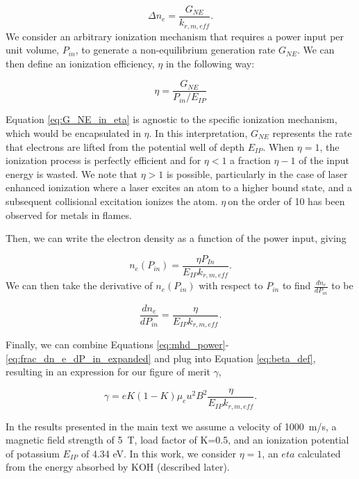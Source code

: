 \begin{equation}
\Delta n_{e} = \frac{G_{NE}}{k_{r, m, eff}}.
\end{equation}
We consider an arbitrary ionization mechanism that requires a power input per unit volume, \(P_{in}\), to generate a non-equilibrium generation rate \(G_{NE}\). We can then define an ionization efficiency, \(\eta\) in the following way: 

\begin{equation}
\eta = \frac{G_{NE}}{P_{in}/E_{IP}}
\label{eq:G_NE_in_eta}
\end{equation}

Equation \ref{eq:G_NE_in_eta} is agnostic to the specific ionization mechanism, which would be encapsulated in \(\eta\). In this interpretation, \(G_{NE}\) represents the rate that electrons are lifted from the potential well of depth \(E_{IP}\). When \(\eta = 1\), the ionization process is perfectly efficient and for \(\eta < 1\) a fraction \(\eta - 1\) of the input energy is wasted. We note that \(\eta > 1\) is possible, particularly in the case of laser enhanced ionization where a laser excites an atom to a higher bound state, and a subsequent collisional excitation ionizes the atom. \(\eta\ \)on the order of 10 has been observed for metals in flames.\cite{turkOpticalDetectionLaserInduced1986}

Then, we can write the electron density as a function of the power input, giving

\begin{equation}
n_{e}(P_{in}) = \frac{\eta P_{In}}{E_{IP}k_{r, m, eff}}.
\end{equation}
We can then take the derivative of $n_{e}(P_{in})$ with respect to $P_{in}$ to find $\frac{dn_{e}}{dP_{in}}$ to be

\begin{equation}
\frac{dn_{e}}{dP_{in}} = \frac{\eta}{E_{IP}k_{r, m, eff}}.
\label{eq:frac_dn_e_dP_in_expanded}
\end{equation}

Finally, we can combine Equations \ref{eq:mhd_power}-\ref{eq:frac_dn_e_dP_in_expanded} and plug into Equation \ref{eq:beta_def}, resulting in an expression for our figure of merit $\gamma$,

\begin{equation}
  \label{eq:gamma-final}
\gamma =  e K (1-K) \mu_e u^2 B^2 \frac{\eta}{E_{IP}k_{r, m, eff}}.
\end{equation}

In the results presented in the main text we assume a velocity of \SI{1000}{\meter/\second}, a magnetic field strength of \SI{5}{\tesla}, load factor of K=0.5, and an ionization potential of potassium $E_{IP}$ of 4.34 eV. In this work, we consider $\eta = 1$, an $eta$ calculated from the energy absorbed by KOH (described later). 

